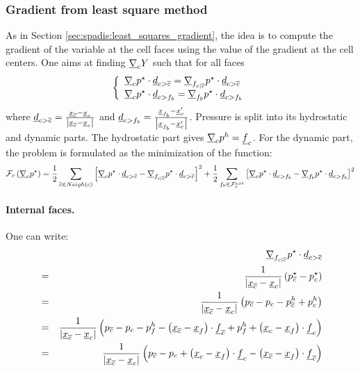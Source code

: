 \subsubsection{Gradient from least square method}

As in Section \ref{sec:spadis:least_squares_gradient}, the idea is to compute
the gradient of the variable at the cell faces using the value of the gradient
at the cell centers. One aims at finding $\underline{\nabla}_{c}{ Y}$ such
that for all faces
\begin{equation}
	\left\{\begin{array}{l}
		\underline{\nabla}_{c}{p^{\star}}\cdot\underline{d}_{{c > {\overline{c}}}}=\underline{\nabla}_{{{f}_{c|{\overline{c}}}}}{p^{\star}}\cdot\underline{d}_{{c > {\overline{c}}}} \\
		\underline{\nabla}_{c}{p^{\star}}\cdot\underline{d}_{{c>{{f}_{b}}}}=\underline{\nabla}_{{{f}_{b}}}{p^{\star}}\cdot\underline{d}_{{c>{{f}_{b}}}}
	\end{array}\right.
\end{equation}
where $\underline{d}_{{c > {\overline{c}}}}=\frac{\underline{x}_{{\overline{c}}}-{\underline{x}_{c}}}{\left| \underline{x}_{{\overline{c}}}-{\underline{x}_{c}} \right|}$ and
$\underline{d}_{{c>{{f}_{b}}}}=\frac{\underline{x}_{{{f}_{b}}}-\underline{x}_{c}^\prime}{\left| \underline{x}_{{{f}_{b}}}-\underline{x}_{c}^\prime \right|}$.
Pressure is split into its hydrostatic and dynamic parts. The hydrostatic part
gives $\underline{\nabla}_{c}{p^h}=\underline{f}_{c}$. For the dynamic part, the problem
is formulated as the minimization of the function:
\begin{equation}
	\mathcal{F}_{c}\left(\underline{\nabla}_{c}{p^{\star}}\right)=\frac{1}{2}\sum_{{\overline{c}} \in Neigh\left(c\right)}\left[\underline{\nabla}_{c}{p^\star}\cdot\underline{d}_{{c > {\overline{c}}}}-\underline{\nabla}_{{{f}_{c|{\overline{c}}}}}{p^\star}\cdot\underline{d}_{{c > {\overline{c}}}}\right]^2+\frac{1}{2}\sum_{{{f}_{b}} \in \mathcal{F}^{ext}_{c}}\left[\underline{\nabla}_{c}{p^\star}\cdot\underline{d}_{{c>{{f}_{b}}}}-\underline{\nabla}_{{{f}_{b}}}{p^\star}\cdot\underline{d}_{{c>{{f}_{b}}}}\right]^2
\end{equation}

\paragraph{Internal faces.} One can write:
\begin{align*}
	&&\underline{\nabla}_{{{f}_{c|{\overline{c}}}}}{p^\star}\cdot\underline{d}_{{c > {\overline{c}}}} \\
	&=&\frac{1}{\left| \underline{x}_{{\overline{c}}}-{\underline{x}_{c}} \right|}\left(p_{{\overline{c}}}^\star-p_{c}^\star\right) \\
	&=&\frac{1}{\left| \underline{x}_{{\overline{c}}}-{\underline{x}_{c}} \right|}\left(p_{{\overline{c}}}-p_{c}-p_{{\overline{c}}}^{h}+p_{c}^{h}\right) \\
	&=&\frac{1}{\left| \underline{x}_{{\overline{c}}}-{\underline{x}_{c}} \right|}\left(p_{{\overline{c}}}-p_{c}-p_{{f}}^{h}-\left(\underline{x}_{{\overline{c}}}-\underline{x}_{{f}}\right)\cdot\underline{f}_{{\overline{c}}}+p_{{f}}^{h}+\left({\underline{x}_{c}}-\underline{x}_{{f}}\right)\cdot\underline{f}_{c}\right) \\
	&=&\frac{1}{\left| \underline{x}_{{\overline{c}}}-{\underline{x}_{c}} \right|}\left(p_{{\overline{c}}}-p_{c}+\left({\underline{x}_{c}}-\underline{x}_{{f}}\right)\cdot\underline{f}_{c}-\left(\underline{x}_{{\overline{c}}}-\underline{x}_{{f}}\right)\cdot\underline{f}_{{\overline{c}}}\right)
\end{align*}

